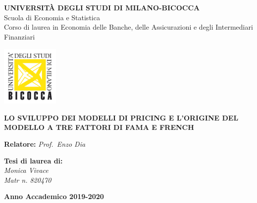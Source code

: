 \documentclass[12pt,a4paper]{report}
\begin{document}
\begin{center}
	\begin{onehalfspace}
		\par
		\textbf{UNIVERSITÀ DEGLI STUDI DI MILANO-BICOCCA} \\
		Scuola di Economia e Statistica \\
		Corso di laurea in Economia delle Banche, delle Assicurazioni e degli Intermediari Finanziari
	\end{onehalfspace}
\end{center}
\smallskip
\begin{center}
	\includegraphics[width=2.78cm, height=2.96cm]{"imgs/bicocca3"}
\end{center}
\par
\smallskip
\begin{doublespace}
	\begin{center}
		{{\large\textbf{LO SVILUPPO DEI MODELLI DI PRICING E L'ORIGINE DEL MODELLO A TRE FATTORI DI FAMA E FRENCH}}}
	\end{center}
\end{doublespace}

\vfill


\begin{onehalfspace}
	\begin{flushleft}
		{\large \textbf{Relatore:} \textit{Prof.\ Enzo Dia} \\}
	\end{flushleft}
	
	\vspace{8mm}
	\par
	
	\begin{flushright}
		{\large \textbf{Tesi di laurea di:} \\
			\textit{Monica Vivace \\ Matr n. 820470}}
	\end{flushright}
\end{onehalfspace}

\vfill
\par

\begin{center}
	{\large \textbf{Anno Accademico 2019-2020}}
\end{center}








\tableofcontents
\cleardoublepage
{} %












\end{document}
